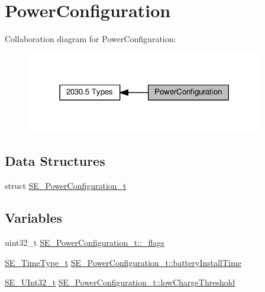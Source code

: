 \hypertarget{group__PowerConfiguration}{}\section{Power\+Configuration}
\label{group__PowerConfiguration}
Collaboration diagram for Power\+Configuration\+:\nopagebreak
\begin{figure}[H]
\begin{center}
\leavevmode
\includegraphics[width=294pt]{group__PowerConfiguration}
\end{center}
\end{figure}
\subsection*{Data Structures}
\begin{DoxyCompactItemize}
\item 
struct \hyperlink{structSE__PowerConfiguration__t}{S\+E\+\_\+\+Power\+Configuration\+\_\+t}
\end{DoxyCompactItemize}
\subsection*{Variables}
\begin{DoxyCompactItemize}
\item 
uint32\+\_\+t \hyperlink{group__PowerConfiguration_gaffb8f5fe39b37d5db62a169a4add7087}{S\+E\+\_\+\+Power\+Configuration\+\_\+t\+::\+\_\+flags}
\item 
\hyperlink{group__TimeType_ga6fba87a5b57829b4ff3f0e7638156682}{S\+E\+\_\+\+Time\+Type\+\_\+t} \hyperlink{group__PowerConfiguration_gabe59076653672547fa38fa99fea40738}{S\+E\+\_\+\+Power\+Configuration\+\_\+t\+::battery\+Install\+Time}
\item 
\hyperlink{group__UInt32_ga70bd4ecda3c0c85d20779d685a270cdb}{S\+E\+\_\+\+U\+Int32\+\_\+t} \hyperlink{group__PowerConfiguration_gaec3de6e5b673fb3fd57c4bcf33491360}{S\+E\+\_\+\+Power\+Configuration\+\_\+t\+::low\+Charge\+Threshold}
\end{DoxyCompactItemize}


